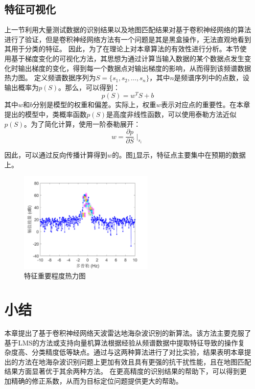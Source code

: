 \subsection{特征可视化}

上一节利用大量测试数据的识别结果以及地图匹配结果对基于卷积神经网络的算法进行了验证，但是卷积神经网络方法有一个问题是其是黑盒操作，无法直观地看到其用于分类的特征。
因此，为了在理论上对本章算法的有效性进行分析。本节使用基于梯度变化的可视化方法，其思想为通过计算当输入数据的某个数据点发生变化时输出梯度的变化，得到每一个数据点对输出梯度的影响，从而得到该频谱数据热力图。
定义频谱数据序列为$ S = \{s_1, s_2, \dots,s_n\} $，其中$n$是频谱序列中的点数，设输出概率为$p(S)$。那么，可以得到：
\begin{equation}
	p(S) = w^TS+b
	\label{equ:ps}
\end{equation}
其中$ w $和$ b $分别是模型的权重和偏差。实际上，权重$ w $表示对应点的重要性。在本章提出的模型中，类概率函数$p(S)$是高度非线性函数，可以使用泰勒方法近似$p(S)$。为了简化计算，使用一阶泰勒展开：
\begin{equation}
	w = \frac{\partial{p}}{\partial{S}}{\mid}_{s_i}
	\label{equ:w}
\end{equation}

因此，可以通过反向传播计算得到$ w $的。图\ref{fig:vis}显示，特征点主要集中在预期的数据上。
\begin{figure}[hbt]
	\setlength{\belowcaptionskip}{0pt}
	\centering
	\includegraphics[width=6.67cm]{figures/othr/heatmap}
	\caption{特征重要程度热力图}
	\label{fig:vis}
\end{figure}

\section{小结}
\label{sec:othr_summary}
本章提出了基于卷积神经网络天波雷达地海杂波识别的新算法。该方法主要克服了基于LMS的方法或支持向量机算法根据经验从频谱数据中提取特征导致的操作复杂度高、分类精度低等缺点。通过与这两种算法进行了对比实验，结果表明本章提出的方法在地海杂波识别问题上更加有效且具有更强的抗干扰性能，且在地图匹配结果方面显著优于其余两种方法。
在更高精度的识别结果的帮助下，可以得到更加精确的修正系数，从而为目标定位问题提供更大的帮助。
